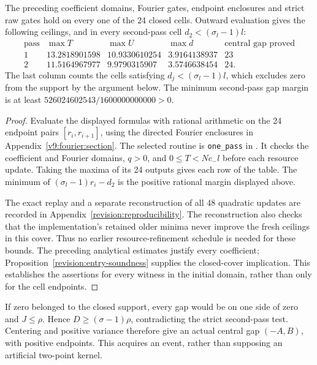\begin{proposition}\label{v9:entry:two-pass-condition}
The preceding coefficient domains, Fourier gates, endpoint enclosures
and strict raw gates hold on every one of the 24 closed cells. Outward
evaluation gives the following ceilings, and in every second-pass cell
$d_2<(\sigma_l-1)l$:
\[
\begin{array}{c|r|r|r|c}
 \text{pass}&\max T&\max U&\max d&\text{central gap proved}\\\hline
 1&13.2818901598&10.9330610254&3.9164138937&23\\
 2&11.5164967977&9.9790315907&3.5746638454&24.
\end{array}
\]
The last column counts the cells satisfying $d_j<(\sigma_l-1)l$,
which excludes zero from the support by the argument below.
The minimum second-pass gap margin is at least
$526024602543/1600000000000>0$.
\end{proposition}
\begin{proof}
Evaluate the displayed formulas with rational arithmetic on the 24
endpoint pairs $[r_i,r_{i+1}]$, using the directed Fourier enclosures in
Appendix~\ref{v9:fourier:section}. The selected routine is
\texttt{one\_pass} in
.
It checks the coefficient and Fourier domains, $q>0$, and
$0\le T<Nc_-l$ before each resource update. Taking the maxima of its
24 outputs gives each row of the table. The minimum of
$(\sigma_l-1)r_i-d_2$ is the positive rational margin displayed above.

The exact replay and a separate reconstruction of all 48 quadratic
updates are recorded in Appendix~\ref{revision:reproducibility}.
The reconstruction also checks that the implementation's retained
older minima never improve the fresh ceilings in this cover. Thus no
earlier resource-refinement schedule is needed for these bounds.
The preceding analytical estimates justify every coefficient;
Proposition~\ref{revision:entry-soundness} supplies the closed-cover
implication. This establishes the assertions for every witness in
the initial domain, rather than only for the cell endpoints.
\end{proof}

If zero belonged to the closed support, every gap would be on one side
of zero and $J\le\rho$. Hence $D\ge(\sigma-1)\rho$, contradicting the
strict second-pass test. Centering and positive variance therefore give
an actual central gap $(-A,B)$, with positive endpoints. This acquires
an event, rather than supposing an artificial two-point kernel.

